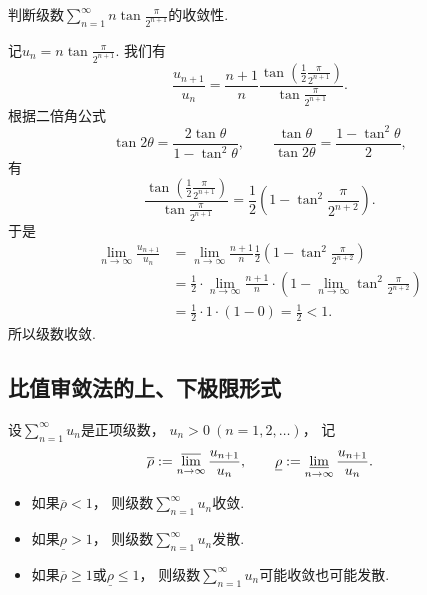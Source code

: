 \begin{example}
判断级数\(\sum_{n=1}^\infty n \tan\frac{\pi}{2^{n+1}}\)的收敛性.
\begin{solution}
记\(u_n = n \tan\frac{\pi}{2^{n+1}}\).
我们有\[
	\frac{u_{n+1}}{u_n}
	= \frac{n+1}{n} \frac{\tan(\frac{1}{2}\frac{\pi}{2^{n+1}})}{\tan\frac{\pi}{2^{n+1}}}.
\]
根据二倍角公式\[
	\tan2\theta = \frac{2\tan\theta}{1-\tan^2\theta},
	\qquad
	\frac{\tan\theta}{\tan2\theta} = \frac{1-\tan^2\theta}{2},
\]
有\[
	\frac{\tan(\frac{1}{2}\frac{\pi}{2^{n+1}})}{\tan\frac{\pi}{2^{n+1}}}
	= \frac{1}{2} \left(
		1-\tan^2\frac{\pi}{2^{n+2}}
	\right).
\]
于是\begin{align*}
	\lim_{n\to\infty} \frac{u_{n+1}}{u_n}
	&= \lim_{n\to\infty} \frac{n+1}{n} \frac{1}{2} \left(
		1-\tan^2\frac{\pi}{2^{n+2}}
	\right) \\
	&= \frac{1}{2} \cdot \lim_{n\to\infty} \frac{n+1}{n} \cdot \left(
		1 - \lim_{n\to\infty} \tan^2\frac{\pi}{2^{n+2}}
	\right) \\
	&= \frac{1}{2} \cdot 1 \cdot (1 - 0) = \frac{1}{2} < 1.
\end{align*}
所以级数收敛.
\end{solution}
\end{example}

\subsection{比值审敛法的上、下极限形式}
\begin{corollary}\label{theorem:无穷级数.正项级数的比值审敛法的上下极限形式}
\def\orho{\overline{\rho}}
\def\urho{\underline{\rho}}
设\(\sum_{n=1}^\infty u_n\)是正项级数，%
\(u_n > 0\ (n=1,2,\dotsc)\)，%
记\[
	\orho
	\defeq
	\varlimsup_{n\to\infty} \frac{u_{n+1}}{u_n},
	\qquad
	\urho
	\defeq
	\varliminf_{n\to\infty} \frac{u_{n+1}}{u_n}.
\]
\begin{itemize}
	\item 如果\(\orho < 1\)，
	则级数\(\sum_{n=1}^\infty u_n\)收敛.

	\item 如果\(\urho > 1\)，
	则级数\(\sum_{n=1}^\infty u_n\)发散.

	\item 如果\(\orho \geq 1\)或\(\urho \leq 1\)，
	则级数\(\sum_{n=1}^\infty u_n\)可能收敛也可能发散.
\end{itemize}
\end{corollary}

